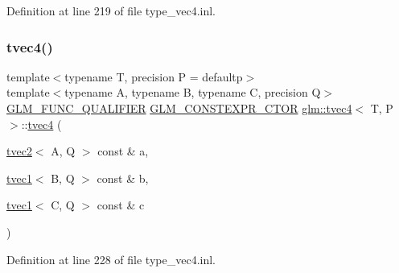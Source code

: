 Definition at line 219 of file type\+\_\+vec4.\+inl.

\mbox{\label{structglm_1_1tvec4_a959ee910b134382dde25fab416907997}} 
\subsubsection{\texorpdfstring{tvec4()}{tvec4()}\hspace{0.1cm}{\footnotesize\ttfamily [25/35]}}
{\footnotesize\ttfamily template$<$typename T, precision P = defaultp$>$ \\
template$<$typename A, typename B, typename C, precision Q$>$ \\
\mbox{\hyperlink{setup_8hpp_a33fdea6f91c5f834105f7415e2a64407}{G\+L\+M\+\_\+\+F\+U\+N\+C\+\_\+\+Q\+U\+A\+L\+I\+F\+I\+ER}} \mbox{\hyperlink{setup_8hpp_ad34178a09666081abdb573c14d1f4a5a}{G\+L\+M\+\_\+\+C\+O\+N\+S\+T\+E\+X\+P\+R\+\_\+\+C\+T\+OR}} \mbox{\hyperlink{structglm_1_1tvec4}{glm\+::tvec4}}$<$ T, P $>$\+::\mbox{\hyperlink{structglm_1_1tvec4}{tvec4}} (\begin{DoxyParamCaption}\item[{\mbox{\hyperlink{structglm_1_1tvec2}{tvec2}}$<$ A, Q $>$ const \&}]{a,  }\item[{\mbox{\hyperlink{structglm_1_1tvec1}{tvec1}}$<$ B, Q $>$ const \&}]{b,  }\item[{\mbox{\hyperlink{structglm_1_1tvec1}{tvec1}}$<$ C, Q $>$ const \&}]{c }\end{DoxyParamCaption})}



Definition at line 228 of file type\+\_\+vec4.\+inl.

\mbox{\label{structglm_1_1tvec4_a8b7af1627a9ecb07b5c1a2f5dc43616d}} 
